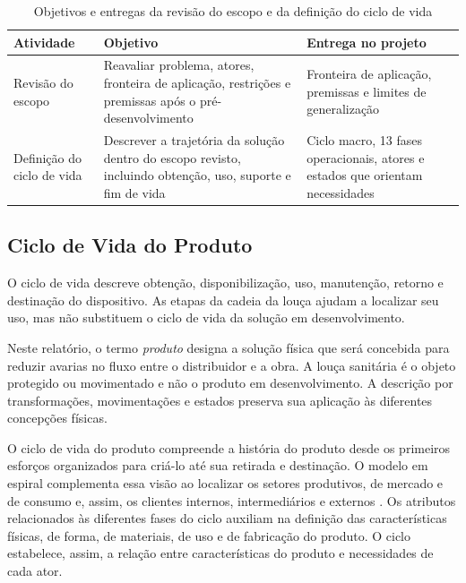 \begin{table}[H]
\caption{Objetivos e entregas da revisão do escopo e da definição do ciclo de vida}
\label{tab:escopo-ciclo}
\centering\footnotesize
\begin{tabularx}{\textwidth}{L{2.7cm}YY}
\toprule\textbf{Atividade}&\textbf{Objetivo}&\textbf{Entrega no projeto}\\\midrule
Revisão do escopo&Reavaliar problema, atores, fronteira de aplicação, restrições e premissas após o pré-desenvolvimento&Fronteira de aplicação, premissas e limites de generalização\\
Definição do ciclo de vida&Descrever a trajetória da solução dentro do escopo revisto, incluindo obtenção, uso, suporte e fim de vida&Ciclo macro, 13 fases operacionais, atores e estados que orientam necessidades\\
\bottomrule\end{tabularx}
\end{table}

\subsection{Ciclo de Vida do Produto}
\label{sec:ciclo-vida}

O ciclo de vida descreve obtenção, disponibilização, uso, manutenção, retorno e destinação do dispositivo. As etapas da cadeia da louça ajudam a localizar seu uso, mas não substituem o ciclo de vida da solução em desenvolvimento.

Neste relatório, o termo \textit{produto} designa a solução física que será concebida para reduzir avarias no fluxo entre o distribuidor e a obra. A louça sanitária é o objeto protegido ou movimentado e não o produto em desenvolvimento. A descrição por transformações, movimentações e estados preserva sua aplicação às diferentes concepções físicas.

O ciclo de vida do produto compreende a história do produto desde os primeiros esforços organizados para criá-lo até sua retirada e destinação. O modelo em espiral complementa essa visão ao localizar os setores produtivos, de mercado e de consumo e, assim, os clientes internos, intermediários e externos \citep{rozenfeld2006,back2008,fonseca2000}. Os atributos relacionados às diferentes fases do ciclo auxiliam na definição das características físicas, de forma, de materiais, de uso e de fabricação do produto. O ciclo estabelece, assim, a relação entre características do produto e necessidades de cada ator.

